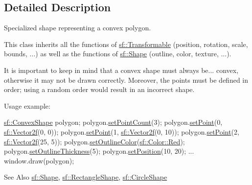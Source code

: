 \subsection{Detailed Description}
Specialized shape representing a convex polygon. 

This class inherits all the functions of \hyperlink{classsf_1_1_transformable}{sf\-::\-Transformable} (position, rotation, scale, bounds, ...) as well as the functions of \hyperlink{classsf_1_1_shape}{sf\-::\-Shape} (outline, color, texture, ...).

It is important to keep in mind that a convex shape must always be... convex, otherwise it may not be drawn correctly. Moreover, the points must be defined in order; using a random order would result in an incorrect shape.

Usage example\-: 
\begin{DoxyCode}
\hyperlink{classsf_1_1_convex_shape}{sf::ConvexShape} polygon;
polygon.\hyperlink{classsf_1_1_convex_shape_a56e6e79ade6dd651cc1a0e39cb68deae}{setPointCount}(3);
polygon.\hyperlink{classsf_1_1_convex_shape_a5929e0ab0ba5ca1f102b40c234a8e92d}{setPoint}(0, \hyperlink{classsf_1_1_vector2}{sf::Vector2f}(0, 0));
polygon.\hyperlink{classsf_1_1_convex_shape_a5929e0ab0ba5ca1f102b40c234a8e92d}{setPoint}(1, \hyperlink{classsf_1_1_vector2}{sf::Vector2f}(0, 10));
polygon.\hyperlink{classsf_1_1_convex_shape_a5929e0ab0ba5ca1f102b40c234a8e92d}{setPoint}(2, \hyperlink{classsf_1_1_vector2}{sf::Vector2f}(25, 5));
polygon.\hyperlink{classsf_1_1_shape_a5978f41ee349ac3c52942996dcb184f7}{setOutlineColor}(\hyperlink{classsf_1_1_color_a7052b1c5408a953e25f9691e0e828c9d}{sf::Color::Red});
polygon.\hyperlink{classsf_1_1_shape_a5ad336ad74fc1f567fce3b7e44cf87dc}{setOutlineThickness}(5);
polygon.\hyperlink{classsf_1_1_transformable_a4dbfb1a7c80688b0b4c477d706550208}{setPosition}(10, 20);
...
window.draw(polygon);
\end{DoxyCode}


\begin{DoxySeeAlso}{See Also}
\hyperlink{classsf_1_1_shape}{sf\-::\-Shape}, \hyperlink{classsf_1_1_rectangle_shape}{sf\-::\-Rectangle\-Shape}, \hyperlink{classsf_1_1_circle_shape}{sf\-::\-Circle\-Shape} 
\end{DoxySeeAlso}


